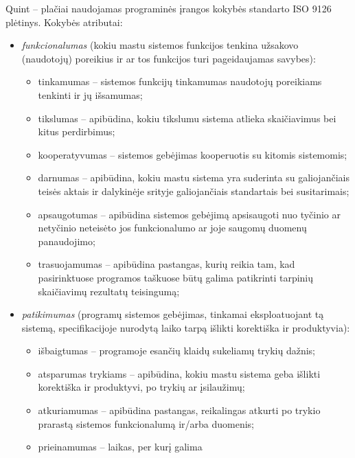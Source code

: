 Quint – plačiai naudojamas programinės įrangos kokybės standarto
ISO 9126 plėtinys. Kokybės atributai:
\begin{itemize}
  \item \emph{funkcionalumas} (kokiu mastu sistemos funkcijos tenkina
    užsakovo (naudotojų) poreikius ir ar tos funkcijos turi pageidaujamas
    savybes):
    \begin{itemize}
      \item tinkamumas  – sistemos funkcijų tinkamumas
        naudotojų poreikiams tenkinti ir jų išsamumas;
      \item tikslumas  – apibūdina, kokiu tikslumu sistema
        atlieka skaičiavimus bei kitus perdirbimus;
      \item kooperatyvumas  – sistemos gebėjimas
        kooperuotis su kitomis sistemomis;
      \item darnumas  – apibūdina, kokiu mastu sistema
        yra suderinta su galiojančiais teisės aktais ir dalykinėje
        srityje galiojančiais standartais bei susitarimais;
      \item apsaugotumas  – apibūdina sistemos gebėjimą
        apsisaugoti nuo tyčinio ar netyčinio neteisėto jos funkcionalumo
        ar joje saugomų duomenų panaudojimo;
      \item trasuojamumas  – apibūdina pastangas,
        kurių reikia tam, kad pasirinktuose programos taškuose būtų
        galima patikrinti tarpinių skaičiavimų rezultatų teisingumą;
    \end{itemize}
  \item \emph{patikimumas}  (programų sistemos gebėjimas,
    tinkamai eksploatuojant tą sistemą, specifikacijoje nurodytą laiko
    tarpą išlikti korektiška ir produktyvia):
    \begin{itemize}
      \item išbaigtumas  – programoje esančių klaidų 
        sukeliamų trykių dažnis;
      \item atsparumas trykiams  – apibūdina, kokiu
        mastu sistema geba išlikti korektiška ir produktyvi, po
        trykių ar įsilaužimų;
      \item atkuriamumas  – apibūdina pastangas,
        reikalingas atkurti po trykio prarastą sistemos funkcionalumą
        ir/arba duomenis;
      \item prieinamumas  – laikas, per kurį galima

\end{itemize}
\end{itemize}
